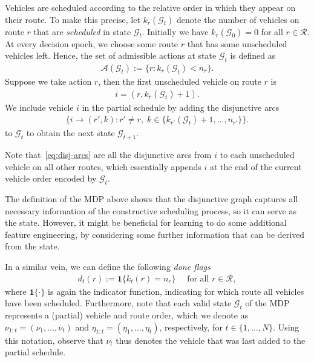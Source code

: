 \documentclass[a4paper]{report}
\theoremstyle{definition}
\theoremstyle{plain}
\begin{document}
Vehicles are scheduled according to the relative order in which they appear on
their route. To make this precise, let $k_r(\mathcal{G}_t)$ denote the number of
vehicles on route $r$ that are \emph{scheduled} in state $\mathcal{G}_t$.
%
Initially we have $k_r(\mathcal{G}_0) = 0$ for all $r \in \mathcal{R}$.
%
At every decision epoch, we choose some route $r$ that has some unscheduled
vehicles left. Hence, the set of admissible actions at state $\mathcal{G}_t$ is
defined as
\begin{align}
  \label{eq:5}
  \mathcal{A}(\mathcal{G}_t) := \{ r: k_r(\mathcal{G}_t) < n_r \} .
\end{align}
%
Suppose we take action $r$, then the first unscheduled vehicle on route $r$ is
\begin{align}
  i = (r, k_r(\mathcal{G}_t) + 1).
\end{align}
%
We include vehicle $i$ in the partial schedule by adding the disjunctive arcs
\begin{align}
  \label{eq:disj-arcs}
  \big\{ i \rightarrow (r', k) : r' \neq r, \;  k \in \{ k_{r'}(\mathcal{G}_t) + 1, \dots, n_{r'} \} \big\} .
\end{align}
to $\mathcal{G}_t$ to obtain the next state $\mathcal{G}_{t+1}$.

Note that~\eqref{eq:disj-arcs} are all the disjunctive arcs from $i$ to each
unscheduled vehicle on all other routes, which essentially appends $i$ at the
end of the current vehicle order encoded by $\mathcal{G}_t$.

The definition of the MDP above shows that the disjunctive graph captures all
necessary information of the constructive scheduling process, so it can serve as
the state.
%
However, it might be beneficial for learning to do some additional feature
engineering, by considering some further information that can be derived from
the state.

%
In a similar vein, we can define the following \emph{done flags}
\begin{align}
  d_t(r) := \mathbf{1}\{ k_t(r) = n_r \} \quad \text{ for all } r \in \mathcal{R} ,
\end{align}
where $\mathbf{1}\{ \cdot \}$ is again the indicator function, indicating for
which route all vehicles have been scheduled.
%
Furthermore, note that each valid state $\mathcal{G}_t$ of the MDP represents a
(partial) vehicle and route order, which we denote as
$\nu_{1:t} = (\nu_1, \dots, \nu_t)$ and $\eta_{1:t} = (\eta_1,\dots, \eta_t)$,
respectively, for $t \in \{1, \dots, N\}$.
%
Using this notation, observe that $\nu_t$ thus denotes the vehicle that was last
added to the partial schedule.
\end{document}
